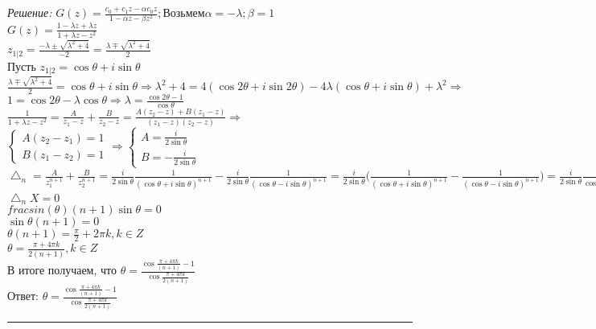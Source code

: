 \documentclass[a4paper, 12pt]{article}
\newenvironment{solution}
    {\textit{Решение: }}
    {\noindent\rule{7in}{1.5pt}}
\begin{document}
\begin{solution}
$\displaystyle
G(z)=\frac{c_0+c_1z-\alpha c_0z}{1-\alpha z-\beta z^2}; Возьмем \alpha=-\lambda; \beta=1$
\\
$\displaystyle
G(z)=\frac{1-\lambda z+\lambda z}{1+\lambda z-z^2}$
\\
$\displaystyle
z_{1|2}=\frac{-\lambda\pm\sqrt{\lambda^2+4}}{-2}=\frac{\lambda\mp\sqrt{\lambda^2+4}}{2}$
\\
Пусть $z_{1|2}=\cos{\theta}+i\sin{\theta}$
\\
$\displaystyle
\frac{\lambda\mp\sqrt{\lambda^2+4}}{2}=\cos{\theta}+i\sin{\theta}\Rightarrow\lambda^2+4=4(\cos{2\theta}+i\sin{2\theta})-4\lambda(\cos{\theta}+i\sin{\theta})+\lambda^2\Rightarrow$
\\
$\displaystyle
1=\cos{2\theta}-\lambda\cos{\theta}\Rightarrow\lambda=\frac{\cos{2\theta}-1}{\cos{\theta}}$
\\
$\displaystyle
\frac{1}{1+\lambda z - z^2} = \frac{A}{z_1-z}+\frac{B}{z_2-z}=\frac{A(z_2-z)+B(z_1-z)}{(z_1-z)(z_2-z)}\Rightarrow$
\\
$\displaystyle
\left\{
\begin{aligned}
A(z_2-z_1)=1 \\
B(z_1-z_2)=1 
\end{aligned}
\right.
\Rightarrow
\left\{
\begin{aligned}
A=\frac{i}{2\sin{\theta}} \\
B=-\frac{i}{2\sin{\theta}} 
\end{aligned}
\right.
$
\\
$\displaystyle
\bigtriangleup_n=\frac{A}{z_1^{n+1}}+\frac{B}{z_2^{n+1}}=\frac{i}{2\sin{\theta}}\frac{1}{(\cos{\theta}+i\sin{\theta})^{n+1}}-\frac{i}{2\sin{\theta}}\frac{1}{(\cos{\theta}-i\sin{\theta})^{n+1}}
=
\frac{i}{2\sin{\theta}}\bigl(\frac{1}{(\cos{\theta}+i\sin{\theta})^{n+1}}-\frac{1}{(\cos{\theta}-i\sin{\theta})^{n+1}}\bigr)
=
\frac{i}{2\sin{\theta}}\frac{-2i\sin{\theta}(n+1)}{\cos^2{\theta}(n+1)+\sin^2{\theta}(n+1)}
=
\frac{\sin{\theta}(n+1)}{\sin{\theta}(\cos^2{\theta}(n+1)+\sin^2{\theta})}
=
\frac{\sin{\theta}(n+1)}{\sin{\theta}}
\Rightarrow
\bigtriangleup_n=\frac{\sin{\theta}(n+1)}{\sin{\theta}}
$
\\
$\displaystyle
\bigtriangleup_nX=0$
\\
$\displaystyle
fracsin(\theta)(n+1)\sin{\theta}=0$
\\
$\displaystyle
\sin{\theta}(n+1)=0$
\\
$\displaystyle
\theta(n+1)=\frac{\pi}{2}+2\pi k, k\in Z$
\\
$\displaystyle
\theta=\frac{\pi+4\pi k}{2(n+1)}, k\in Z$
\\
В итоге получаем, что $\displaystyle
\theta=\frac{\cos{\frac{\pi+4\pi k}{(n+1)}}-1}{\cos{\frac{\pi+4\pi k}{2(n+1)}}}$
\\
Ответ: $\displaystyle
\theta=\frac{\cos{\frac{\pi+4\pi k}{(n+1)}}-1}{\cos{\frac{\pi+4\pi k}{2(n+1)}}}
$

\end{solution}
\end{document}
